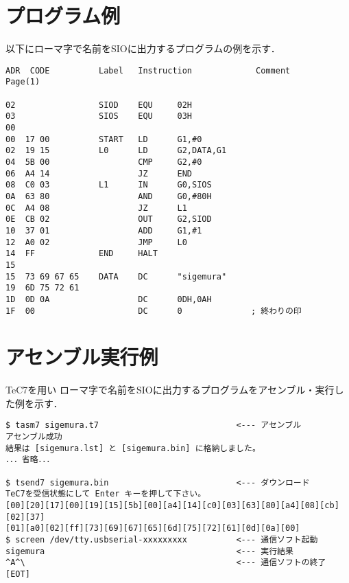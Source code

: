 \newpage
\section{プログラム例}
以下にローマ字で名前をSIOに出力するプログラムの例を示す．

\begin{center}
\begin{verbatim}
ADR  CODE          Label   Instruction             Comment              Page(1)

02                 SIOD    EQU     02H            
03                 SIOS    EQU     03H            
00                 
00  17 00          START   LD      G1,#0          
02  19 15          L0      LD      G2,DATA,G1     
04  5B 00                  CMP     G2,#0          
06  A4 14                  JZ      END            
08  C0 03          L1      IN      G0,SIOS        
0A  63 80                  AND     G0,#80H        
0C  A4 08                  JZ      L1             
0E  CB 02                  OUT     G2,SIOD        
10  37 01                  ADD     G1,#1          
12  A0 02                  JMP     L0             
14  FF             END     HALT                   
15                 
15  73 69 67 65    DATA    DC      "sigemura"     
19  6D 75 72 61 
1D  0D 0A                  DC      0DH,0AH        
1F  00                     DC      0              ; 終わりの印
\end{verbatim}
\end{center}

\section{アセンブル実行例}
TeC7を用い
ローマ字で名前をSIOに出力するプログラムをアセンブル・実行した例を示す．

\begin{center}
\begin{verbatim}
$ tasm7 sigemura.t7                            <--- アセンブル
アセンブル成功
結果は [sigemura.lst] と [sigemura.bin] に格納しました。
．．．省略．．．

$ tsend7 sigemura.bin                          <--- ダウンロード
TeC7を受信状態にして Enter キーを押して下さい。
[00][20][17][00][19][15][5b][00][a4][14][c0][03][63][80][a4][08][cb][02][37]
[01][a0][02][ff][73][69][67][65][6d][75][72][61][0d][0a][00]
$ screen /dev/tty.usbserial-xxxxxxxxx          <--- 通信ソフト起動
sigemura                                       <--- 実行結果
^A^\                                           <--- 通信ソフトの終了
[EOT]
\end{verbatim}
\end{center}

